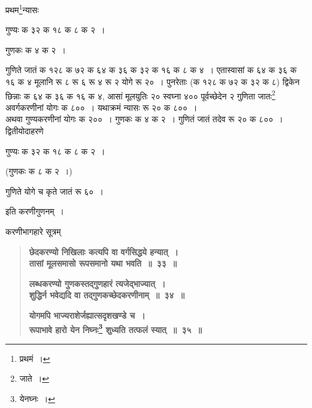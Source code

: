 \documentclass[11pt, openany]{book}
\begin{document}
प्रथम\renewcommand{\thefootnote}{८}\footnote{प्रथमं~।}न्यासः \textendash 
\vspace{2mm}

\hspace{10mm} गुण्यः क ३२ क १८ क ८ क २~। 
\vspace{2mm}

\hspace{10mm} गुणकः क ४ क २~। 
\vspace{12mm}

\newpage

गुणिते जातं क १२८ क ७२ क ६४ क ३६ क ३२ क १६ क ८ क ४~। एतास्वासां क ६४ क ३६ क १६ क ४ मूलानि रू ८ रू ६ रू ४ रू २ योगे रू २०~। पुनरेताः (क १२८ क ७२ क ३२ क ८) द्विकेन छिन्नाः क ६४ क ३६ क १६ क ४, आसां मूलयुतिः २० स्वघ्ना ४०० पूर्वच्छेदेन २ गुणिता जातः\renewcommand{\thefootnote}{१}\footnote{जाते~।} अवर्गकरणीनां योगः क ८००~। यथाक्रमं न्यासः रू २० क ८००~। \\

अथवा गुण्यकरणीनां योगः क २००~। गुणकः क ४ क २~। गुणितं जातं तदेव रू २० क ८००~। \\

द्वितीयोदाहरणे 
\vspace{2mm}

\hspace{10mm} गुण्यः क ३२ क १८ क ८ क २~। 
\vspace{2mm}

\hspace{10mm} (गुणकः क ८ क २~।) 
\vspace{2mm}

\noindent गुणिते योगे च कृते जातं रू ६०~। 

\begin{center}
इति करणीगुणनम्~। 
\end{center}
\vspace{2mm}
 
करणीभागहारे सूत्रम् \textendash 

 \label{33}
\begin{quote}
\textbf{{\color{purple}छेदकरण्यो निखिलाः कत्यपि वा वर्गसिद्धये हन्यात्~।\\
तासां मूलसमासो रूपसमानो यथा भवति~॥~३३~॥}}
\vspace{1mm}

\textbf{{\color{purple}लब्धकरण्यो गुणकस्तद्गुणहारं त्यजेद्भाज्यात्~। \\
शुद्धिर्न भवेद्यदि वा तद्गुणकच्छेदकरणीनाम्~॥~३४~॥}}
\vspace{1mm}

 \label{35}
\textbf{{\color{purple}योगमपि भाज्यराशेर्जह्यात्सदृशखण्डे च~। \\
रूपाभावे हारो येन निघ्नः\renewcommand{\thefootnote}{२}\footnote{येनघ्नः~।} शुध्यति तत्फलं स्यात्~॥~३५~॥}}
\end{quote}
\end{document}
